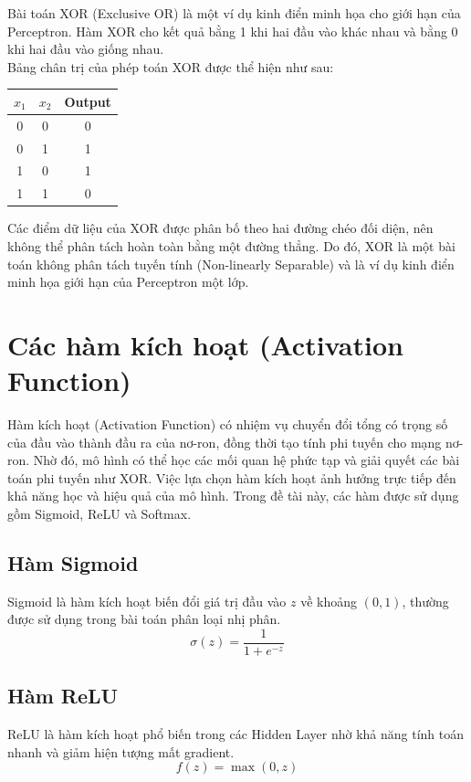 \documentclass[12pt,a4paper]{report}
\begin{document}
Bài toán XOR (Exclusive OR) là một ví dụ kinh điển minh họa cho giới hạn của Perceptron. Hàm XOR cho kết quả bằng 1 khi hai đầu vào khác nhau và bằng 0 khi hai đầu vào giống nhau. \\
Bảng chân trị của phép toán XOR được thể hiện như sau:

\begin{table}[H]
\centering
\begin{tabular}{|c|c|c|}
\hline
$x_1$ & $x_2$ & Output \\
\hline
0 & 0 & 0 \\
0 & 1 & 1 \\
1 & 0 & 1 \\
1 & 1 & 0 \\
\hline
\end{tabular}
\end{table}

Các điểm dữ liệu của XOR được phân bố theo hai đường chéo đối diện, nên không thể phân tách hoàn toàn bằng một đường thẳng. Do đó, XOR là một bài toán không phân tách tuyến tính (Non-linearly Separable) và là ví dụ kinh điển minh họa giới hạn của Perceptron một lớp.

\section{Các hàm kích hoạt (Activation Function)}
Hàm kích hoạt (Activation Function) có nhiệm vụ chuyển đổi tổng có trọng số của đầu vào thành đầu ra của nơ-ron, đồng thời tạo tính phi tuyến cho mạng nơ-ron. Nhờ đó, mô hình có thể học các mối quan hệ phức tạp và giải quyết các bài toán phi tuyến như XOR. Việc lựa chọn hàm kích hoạt ảnh hưởng trực tiếp đến khả năng học và hiệu quả của mô hình. Trong đề tài này, các hàm được sử dụng gồm Sigmoid, ReLU và Softmax.

\subsection{Hàm Sigmoid}
Sigmoid là hàm kích hoạt biến đổi giá trị đầu vào $z$ về khoảng $(0,1)$, thường được sử dụng trong bài toán phân loại nhị phân.
\begin{equation}
    \sigma(z) = \frac{1}{1 + e^{-z}}
\end{equation}

\subsection{Hàm ReLU}
ReLU là hàm kích hoạt phổ biến trong các Hidden Layer nhờ khả năng tính toán nhanh và giảm hiện tượng mất gradient.
\begin{equation}
    f(z) = \max(0, z)
\end{equation}
\end{document}
